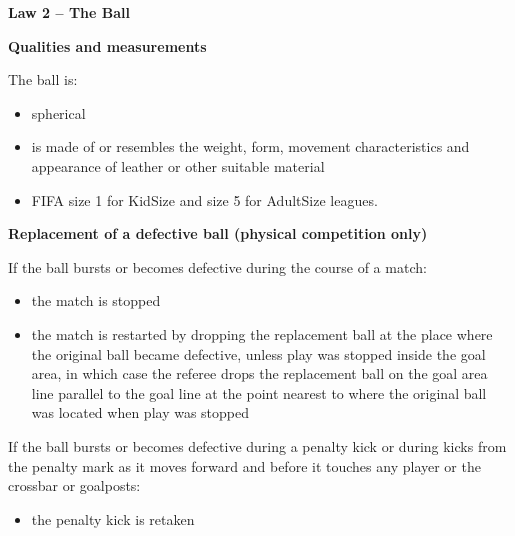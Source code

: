 \clearpage
\sffamily
{\bfseries\color[rgb]{0.4,0.4,0.4}
Law 2 -- The Ball}
{}


\bigskip

{\bfseries Qualities and measurements }

\headlinebox

The ball is:

\begin{itemize}
\item spherical
\item is made of or resembles the weight, form, movement characteristics and appearance of leather or other suitable material
\item FIFA size 1 for KidSize and size 5 for AdultSize leagues. 
\end{itemize}

{\bfseries Replacement of a defective ball (physical competition only)}

\headlinebox

If the ball bursts or becomes defective during the course of a match:

\begin{itemize}
\item the match is stopped
\item the match is restarted by dropping the replacement ball at the place where the original ball became defective, unless play was stopped inside the goal area, in which case the referee drops the replacement ball on the goal area line parallel to the goal line at the point
nearest to where the original ball was located when play was stopped
\end{itemize}

If the ball bursts or becomes defective during a penalty kick or during kicks from the penalty mark as it moves forward and before it touches any player or the crossbar or goalposts:

\begin{itemize}
\item the penalty kick is retaken
\end{itemize}

